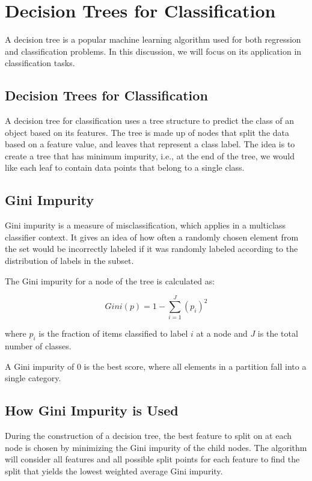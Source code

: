 \chapter{Decision Trees for Classification}

A decision tree is a popular machine learning algorithm used for both regression and classification problems. In this discussion, we will focus on its application in classification tasks. 

\section{Decision Trees for Classification}

A decision tree for classification uses a tree structure to predict the class of an object based on its features. The tree is made up of nodes that split the data based on a feature value, and leaves that represent a class label. The idea is to create a tree that has minimum impurity, i.e., at the end of the tree, we would like each leaf to contain data points that belong to a single class.

\section{Gini Impurity}

Gini impurity is a measure of misclassification, which applies in a multiclass classifier context. It gives an idea of how often a randomly chosen element from the set would be incorrectly labeled if it was randomly labeled according to the distribution of labels in the subset.

The Gini impurity for a node of the tree is calculated as:

\begin{equation}
Gini(p) = 1 - \sum_{i=1}^{J} (p_i)^2
\end{equation}

where $p_i$ is the fraction of items classified to label $i$ at a node and $J$ is the total number of classes.

A Gini impurity of 0 is the best score, where all elements in a partition fall into a single category. 

\section{How Gini Impurity is Used}

During the construction of a decision tree, the best feature to split on at each node is chosen by minimizing the Gini impurity of the child nodes. The algorithm will consider all features and all possible split points for each feature to find the split that yields the lowest weighted average Gini impurity.
